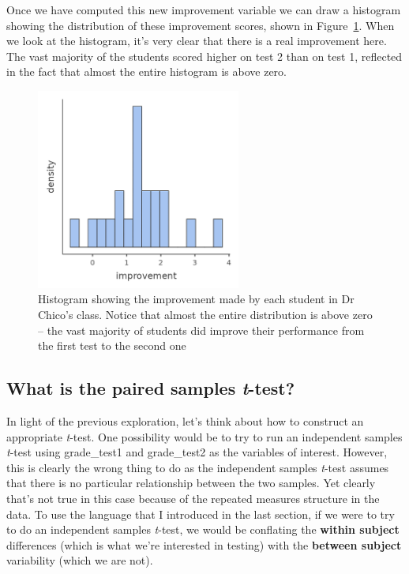 \documentclass[
  a4paper,
]{book}
\begin{document}
Once we have computed this new improvement variable we can draw a
histogram showing the distribution of these improvement scores, shown in
Figure~\ref{fig-fig11-14}. When we look at the histogram, it's very
clear that there is a real improvement here. The vast majority of the
students scored higher on test 2 than on test 1, reflected in the fact
that almost the entire histogram is above zero.

\begin{figure}

\includegraphics[width=0.6\textwidth,height=\textheight]{images/fig11-14.png} \hfill{}

\caption{\label{fig-fig11-14}Histogram showing the improvement made by
each student in Dr Chico's class. Notice that almost the entire
distribution is above zero -- the vast majority of students did improve
their performance from the first test to the second one}

\end{figure}

\hypertarget{what-is-the-paired-samples-t-test}{%
\subsection{\texorpdfstring{What is the paired samples
\emph{t}-test?}{What is the paired samples t-test?}}\label{what-is-the-paired-samples-t-test}}

In light of the previous exploration, let's think about how to construct
an appropriate \emph{t}-test. One possibility would be to try to run an
independent samples \emph{t}-test using grade\_test1 and grade\_test2 as
the variables of interest. However, this is clearly the wrong thing to
do as the independent samples \emph{t}-test assumes that there is no
particular relationship between the two samples. Yet clearly that's not
true in this case because of the repeated measures structure in the
data. To use the language that I introduced in the last section, if we
were to try to do an independent samples \emph{t}-test, we would be
conflating the \textbf{within subject} differences (which is what we're
interested in testing) with the \textbf{between subject} variability
(which we are not).
\end{document}
